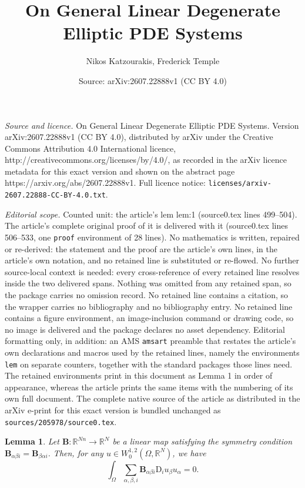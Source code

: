 \documentclass[10pt,a4paper]{amsart}
\title{On General Linear Degenerate Elliptic PDE Systems}
\author{Nikos Katzourakis, Frederick Temple}
\date{Source: arXiv:2607.22888v1 (CC BY 4.0)}
\newtheorem{lem}{Lemma}
\begin{document}
\maketitle

\noindent\emph{Source and licence.} On General Linear Degenerate Elliptic PDE Systems. Version arXiv:2607.22888v1 (CC BY 4.0), distributed by arXiv under the Creative Commons Attribution 4.0 International licence, http://creativecommons.org/licenses/by/4.0/, as recorded in the arXiv licence metadata for this exact version and shown on the abstract page https://arxiv.org/abs/2607.22888v1. Full licence notice: \texttt{licenses/arxiv-2607.22888-CC-BY-4.0.txt}.\par\smallskip

\noindent\textit{Editorial scope.} Counted unit: the article's lem lem:1 (source0.tex lines 499--504). The article's complete original proof of it is delivered with it (source0.tex lines 506--533, one \texttt{proof} environment of 28 lines). No mathematics is written, repaired or re-derived: the statement and the proof are the article's own lines, in the article's own notation, and no retained line is substituted or re-flowed.  No further source-local context is needed: every cross-reference of every retained line resolves inside the two delivered spans.  Nothing was omitted from any retained span, so the package carries no omission record.  No retained line contains a citation, so the wrapper carries no bibliography and no bibliography entry.  No retained line contains a figure environment, an image-inclusion command or drawing code, so no image is delivered and the package declares no asset dependency.  Editorial formatting only, in addition: an AMS \texttt{amsart} preamble that restates the article's own declarations and macros used by the retained lines, namely the environments \texttt{lem} on separate counters, together with the standard packages those lines need.  The retained environments print in this document as Lemma 1 in order of appearance, whereas the article prints the same items with the numbering of its own full document.  The complete native source of the article as distributed in the arXiv e-print for this exact version is bundled unchanged as \texttt{sources/205978/source0.tex}.
\begin{lem} \label{lem:1}
Let $\mathbf{B}: \mathbb{R}^{Nn} \longrightarrow \mathbb{R}^{N}$ be a linear map satisfying the symmetry condition $\mathbf{B}_{\alpha \beta i} = \mathbf{B}_{\beta \alpha i}$. Then, for any $u \in W^{1,2}_0(\Omega, \mathbb{R}^N)$, we have
\begin{equation*}
\int_{\Omega} \sum_{\alpha, \beta, i}\mathbf{B}_{\alpha \beta i} \mathrm{D}_i u_{\beta} u_{\alpha} = 0.
\end{equation*}
\end{lem}
\end{document}
